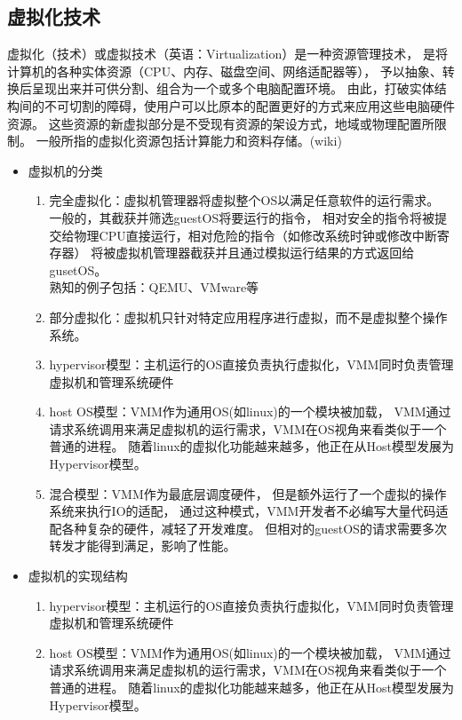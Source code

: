 \documentclass[AutoFakeBold,a4paper]{ctexart}
\begin{document}
\subsection{虚拟化技术}
虚拟化（技术）或虚拟技术（英语：Virtualization）是一种资源管理技术，
是将计算机的各种实体资源（CPU、内存、磁盘空间、网络适配器等），
予以抽象、转换后呈现出来并可供分割、组合为一个或多个电脑配置环境。
由此，打破实体结构间的不可切割的障碍，使用户可以比原本的配置更好的方式来应用这些电脑硬件资源。
这些资源的新虚拟部分是不受现有资源的架设方式，地域或物理配置所限制。
一般所指的虚拟化资源包括计算能力和资料存储。(wiki)
\begin{itemize}
    \item 虚拟机的分类
    \begin{enumerate}
        \item 完全虚拟化：虚拟机管理器将虚拟整个OS以满足任意软件的运行需求。
        一般的，其截获并筛选guestOS将要运行的指令，
        相对安全的指令将被提交给物理CPU直接运行，相对危险的指令（如修改系统时钟或修改中断寄存器）
        将被虚拟机管理器截获并且通过模拟运行结果的方式返回给gusetOS。\\
        熟知的例子包括：QEMU、VMware等
        \item 部分虚拟化：虚拟机只针对特定应用程序进行虚拟，而不是虚拟整个操作系统。
        \item hypervisor模型：主机运行的OS直接负责执行虚拟化，VMM同时负责管理虚拟机和管理系统硬件
        \item host OS模型：VMM作为通用OS(如linux)的一个模块被加载，
        VMM通过请求系统调用来满足虚拟机的运行需求，VMM在OS视角来看类似于一个普通的进程。
        随着linux的虚拟化功能越来越多，他正在从Host模型发展为Hypervisor模型。
        \item 混合模型：VMM作为最底层调度硬件，
        但是额外运行了一个虚拟的操作系统来执行IO的适配，
        通过这种模式，VMM开发者不必编写大量代码适配各种复杂的硬件，减轻了开发难度。
        但相对的guestOS的请求需要多次转发才能得到满足，影响了性能。
    \end{enumerate}
    \item 虚拟机的实现结构
    \begin{enumerate}
        \item hypervisor模型：主机运行的OS直接负责执行虚拟化，VMM同时负责管理虚拟机和管理系统硬件
        \item host OS模型：VMM作为通用OS(如linux)的一个模块被加载，
        VMM通过请求系统调用来满足虚拟机的运行需求，VMM在OS视角来看类似于一个普通的进程。
        随着linux的虚拟化功能越来越多，他正在从Host模型发展为Hypervisor模型。

\end{enumerate}
\end{itemize}
\end{document}
